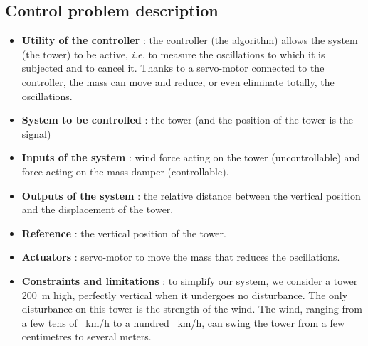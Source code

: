 \subsection{Control problem description}
\begin{itemize}
    \item {\bf Utility of the controller} : the controller (the algorithm) allows the system (the tower) to be active, {\it i.e.} to measure the oscillations to which it is subjected and to cancel it. Thanks to a servo-motor connected to the controller, the mass can move and reduce, or even eliminate totally, the oscillations.
    \item {\bf System to be controlled} : the tower (and the position of the tower is the signal)
    \item {\bf Inputs of the system} : wind force acting on the tower (uncontrollable) and force acting on the mass damper (controllable).
    \item {\bf Outputs of the system} : the relative distance between the vertical position and the displacement of the tower.
    \item {\bf Reference} : the vertical position of the tower.
    \item {\bf Actuators} : servo-motor to move the mass that reduces the oscillations.
    \item {\bf Constraints and limitations} : to simplify our system, we consider a tower \SI{200}{\meter} high, perfectly vertical when it undergoes no disturbance. The only disturbance on this tower is the strength of the wind. The wind, ranging from a few tens of \SI{}{\kilo\meter/\hour} to a hundred \SI{}{\kilo\meter/\hour}, can swing the tower from a few centimetres to several meters.
\end{itemize}

